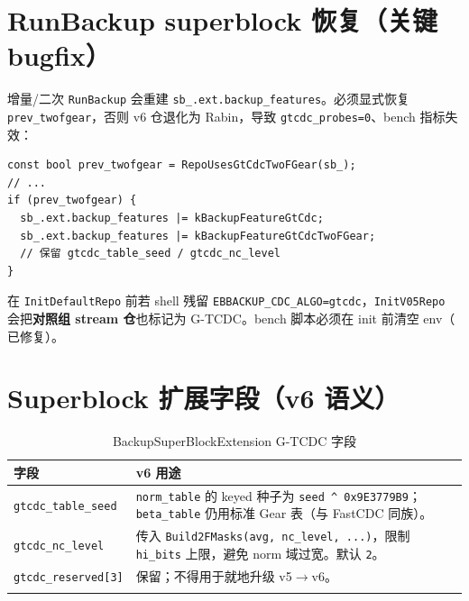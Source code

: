 \section{RunBackup superblock 恢复（关键 bugfix）}

增量/二次 \texttt{RunBackup} 会重建 \texttt{sb\_.ext.backup\_features}。必须显式恢复 \texttt{prev\_twofgear}，否则 v6 仓退化为 Rabin，导致 \texttt{gtcdc\_probes=0}、bench 指标失效：

\begin{lstlisting}[caption={\filepath{backup\_engine.cc} 中 v6 特征恢复（节选）},label={lst:backup-restore-2f}]
const bool prev_twofgear = RepoUsesGtCdcTwoFGear(sb_);
// ...
if (prev_twofgear) {
  sb_.ext.backup_features |= kBackupFeatureGtCdc;
  sb_.ext.backup_features |= kBackupFeatureGtCdcTwoFGear;
  // 保留 gtcdc_table_seed / gtcdc_nc_level
}
\end{lstlisting}

\begin{warnbox}[常见集成陷阱]
在 \texttt{InitDefaultRepo} 前若 shell 残留 \texttt{EBBACKUP\_CDC\_ALGO=gtcdc}，\texttt{InitV05Repo} 会把\textbf{对照组 stream 仓}也标记为 G-TCDC。bench 脚本必须在 init 前清空 env（ 已修复）。
\end{warnbox}

\section{Superblock 扩展字段（v6 语义）}

\begin{longtable}{@{}p{3.5cm}p{10.5cm}@{}}
\toprule
\textbf{字段} & \textbf{v6 用途} \\
\midrule
\endhead
\texttt{gtcdc\_table\_seed} &
  \texttt{norm\_table} 的 keyed 种子为 \texttt{seed \^{} 0x9E3779B9}；\texttt{beta\_table} 仍用标准 Gear 表（与 FastCDC 同族）。 \\
\texttt{gtcdc\_nc\_level} &
  传入 \texttt{Build2FMasks(avg, nc\_level, ...)}，限制 \texttt{hi\_bits} 上限，避免 norm 域过宽。默认 \texttt{2}。 \\
\texttt{gtcdc\_reserved[3]} & 保留；不得用于就地升级 v5$\rightarrow$v6。 \\
\bottomrule
\caption{BackupSuperBlockExtension G-TCDC 字段}
\end{longtable}
